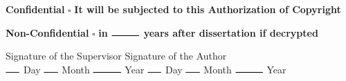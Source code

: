 \setlength{\parskip}{0pt}

\textbf{Confidential} \hspace{0.9cm} $\bm{\square}$ \hfill{\textbf{It will be subjected to this Authorization of Copyright}}

\textbf{Non-Confidential} \hspace{0.07cm} $\bm{\square}$ \hfill{\textbf{in $\rule{1cm}{0.3mm}$ years after dissertation if decrypted}}

\vspace{1.5cm}

\begin{flushleft}
\bfseries

    Signature of the Supervisor \hfill{Signature of the Author} \\
    $\rule{0.5cm}{0.3mm}$ Day $\rule{0.5cm}{0.3mm}$ Month  $\rule{1cm}{0.3mm}$ Year \hfill{$\rule{0.5cm}{0.3mm}$ Day $\rule{0.5cm}{0.3mm}$ Month  $\rule{1cm}{0.3mm}$ Year}

\end{flushleft}









